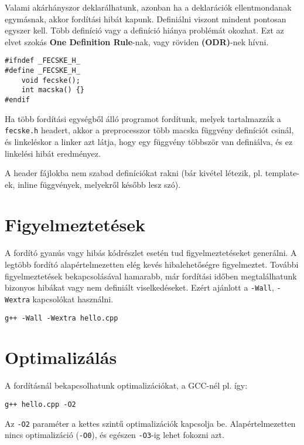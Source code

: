 \documentclass[a4paper,11.5pt,table]{article}
\begin{document}
	Valami akárhányszor deklarálhatunk, azonban ha a deklarációk ellentmondanak egymásnak, akkor fordítási hibát kapunk. Definiálni viszont mindent pontosan egyszer kell. Több definíció vagy a definíció hiánya problémát okozhat. Ezt az elvet szokás \textbf{One Definition Rule}-nak, vagy röviden \textbf{(ODR)}-nek hívni.
	\bigskip
	
	\begin{lstlisting}
#ifndef _FECSKE_H_
#define _FECSKE_H_
	void fecske();
	int macska() {}
#endif
	\end{lstlisting}
		
	Ha több fordítási egységből álló programot fordítunk, melyek tartalmazzák a \texttt{fecske.h} headert, akkor a preprocesszor több macska függvény definíciót csinál, és linkeléskor a linker azt látja, hogy egy függvény többször van definiálva, és ez linkelési hibát eredményez.
	\begin{note}
		A header fájlokba nem szabad definíciókat rakni (bár kivétel létezik, pl. template-ek, inline függvények, melyekről később lesz szó).
	\end{note}
	
	\section{Figyelmeztetések}

  A fordító gyanús vagy hibás kódrészlet esetén tud figyelmeztetéseket generálni. A legtöbb fordító alapértelmezetten elég kevés hibalehetőségre figyelmeztet. További figyelmeztetések bekapcsolásával hamarabb, már fordítási időben megtalálhatunk bizonyos hibákat vagy nem definiált viselkedéseket. Ezért ajánlott a \texttt{-Wall}, \texttt{-Wextra} kapcsolókat használni.

	{\centering \texttt{g++ -Wall -Wextra hello.cpp} \par}

	\section{Optimalizálás}
	A fordításnál bekapcsolhatunk optimalizációkat, a GCC-nél pl. így:
	
	{\centering \texttt{g++ hello.cpp -O2} \par}
	
	Az \texttt{-O2} paraméter a kettes szintű optimalizációk kapcsolja be. Alapértelmezetten nincs optimalizáció (\texttt{-O0}), és egészen \texttt{-O3}-ig lehet fokozni azt.
	\bigskip
	
\end{document}
